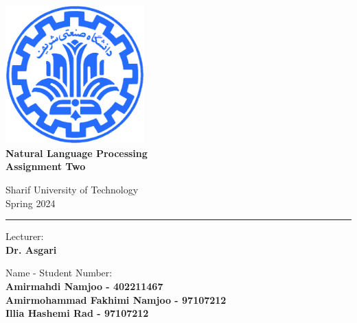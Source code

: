 \documentclass[12pt]{article}
\begin{document}
	
	
\begin{titlepage}
	\begin{center}
		
		\vspace*{0.7cm}
		
		\includegraphics[width=0.4\textwidth]{sharif1.png}\\
		\vspace{0.5cm}
		\textbf{ \Huge{Natural Language Processing} }\\
		\vspace{0.5cm}
		\textbf{ \Large{ Assignment Two} }
		\vspace{0.2cm}
		
		
		\large   Sharif University of Technology\\\vspace{0.2cm}
		\large   Spring 2024 \\\vspace{0.2cm}
		\noindent\rule[1ex]{\linewidth}{1pt}
		Lecturer:\\
		\textbf{{Dr. Asgari}}
		
		
		\vspace{0.15cm}
		Name - Student Number:\\
		
		
		\textbf{{Amirmahdi Namjoo - 402211467}}\\
		\textbf{{Amirmohammad Fakhimi Namjoo - 97107212}}\\
		\textbf{{Illia Hashemi Rad - 97107212}}		
	\end{center}
\end{titlepage}


\newpage
\pagestyle{fancy}
\fancyhf{}
\fancyfoot{}
\cfoot{\thepage}
\end{document}

